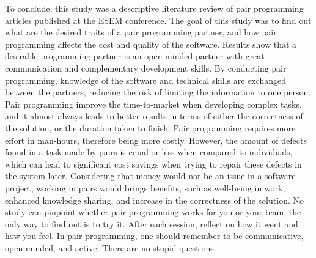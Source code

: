 \documentclass[conference]{IEEEtran}
\begin{document}
To conclude, this study was a descriptive literature review of pair programming articles published at the ESEM conference. The goal of this study was to find out what are the desired traits of a pair programming partner, and how pair programming affects the cost and quality of the software. Results show that a desirable programming partner is an open-minded partner with great communication and complementary development skills. By conducting pair programming, knowledge of the software and technical skills are exchanged between the partners, reducing the risk of limiting the information to one person. Pair programming improve the time-to-market when developing complex tasks, and it almost always leads to better results in terms of either the correctness of the solution, or the duration taken to finish. Pair programming requires more effort in man-hours, therefore being more costly. However, the amount of defects found in a task made by pairs is equal or less when compared to individuals, which can lead to significant cost savings when trying to repair these defects in the system later. Considering that money would not be an issue in a software project, working in pairs would brings benefits, such as well-being in work, enhanced knowledge sharing, and increase in the correctness of the solution. No study can pinpoint whether pair programming works for you or your team, the only way to find out is to try it. After each session, reflect on how it went and how you feel. In pair programming, one should remember to be communicative, open-minded, and active. There are no stupid questions.





\end{document}
